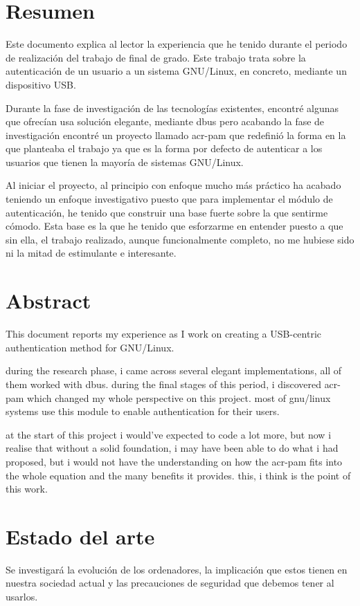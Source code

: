 \documentclass[titlepage, 12pt, a4paper]{article}
\begin{document}
\section*{Resumen}
Este documento explica al lector la experiencia que he tenido durante el periodo de realización del trabajo de final de grado. Este trabajo trata sobre la autenticación de un usuario a un sistema \gls{GNU/Linux}, en concreto, mediante un dispositivo \gls{USB}.\par 
Durante la fase de investigación de las tecnologías existentes, encontré algunas que ofrecían usa solución elegante, mediante \gls{dbus} pero acabando la fase de investigación encontré un proyecto llamado \gls{acr-pam} que redefinió la forma en la que planteaba el trabajo ya que es la forma por defecto de autenticar a los usuarios que tienen la mayoría de sistemas \gls{GNU/Linux}.\par 
Al iniciar el proyecto, al principio con enfoque mucho más práctico ha acabado teniendo un enfoque investigativo puesto que para implementar el módulo de autenticación, he tenido que construir una base fuerte sobre la que sentirme cómodo. Esta base es la que he tenido que esforzarme en entender puesto a que sin ella, el trabajo realizado, aunque funcionalmente completo, no me hubiese sido ni la mitad de estimulante e interesante.
\clearpage
\section*{Abstract}
This document reports my experience as I work on creating a USB-centric authentication method for \gls{GNU/Linux}. \par
during the research phase, i came across several elegant implementations, all of them worked with \gls{dbus}. during the final stages of this period, i discovered \gls{acr-pam} which changed my whole perspective on this project. most of \gls{gnu/linux} systems use this module to enable authentication for their users.\par
at the start of this project i would've expected to code a lot more, but now i realise that without a solid foundation, i may have been able to do what i had proposed, but i would not have the understanding on how the \gls{acr-pam} fits into the whole equation and the many benefits it provides. this, i think is the point of this work.
\clearpage

\tableofcontents
\clearpage
\listoffigures
\clearpage
{}
\section{Estado del arte}
Se investigará la evolución de los ordenadores, la implicación que estos tienen en nuestra sociedad actual y las precauciones de seguridad que debemos tener al usarlos.
\end{document}
